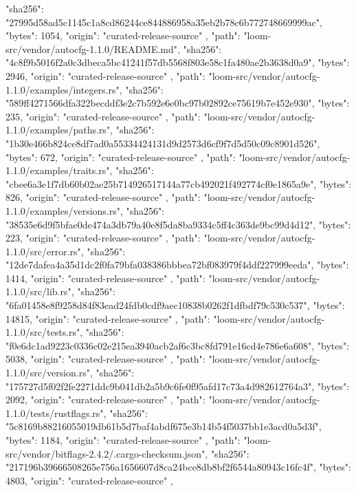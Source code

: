 {{      "sha256": "27995d58ad5c1145c1a8cd86244ce844886958a35eb2b78c6b772748669999ac",
      "bytes": 1054,
      "origin": "curated-release-source"
    },
    {
      "path": "loom-src/vendor/autocfg-1.1.0/README.md",
      "sha256": "4c8f9b5016f2a0c3dbeca5bc41241f57db5568f803e58c1fa480ae2b3638d0a9",
      "bytes": 2946,
      "origin": "curated-release-source"
    },
    {
      "path": "loom-src/vendor/autocfg-1.1.0/examples/integers.rs",
      "sha256": "589ff4271566dfa322becddf3e2c7b592e6e0bc97b02892ce75619b7e452e930",
      "bytes": 235,
      "origin": "curated-release-source"
    },
    {
      "path": "loom-src/vendor/autocfg-1.1.0/examples/paths.rs",
      "sha256": "1b30e466b824ce8df7ad0a55334424131d9d2573d6cf9f7d5d50c09c8901d526",
      "bytes": 672,
      "origin": "curated-release-source"
    },
    {
      "path": "loom-src/vendor/autocfg-1.1.0/examples/traits.rs",
      "sha256": "cbee6a3e1f7db60b02ae25b714926517144a77cb492021f492774cf0e1865a9e",
      "bytes": 826,
      "origin": "curated-release-source"
    },
    {
      "path": "loom-src/vendor/autocfg-1.1.0/examples/versions.rs",
      "sha256": "38535e6d9f5bfae0de474a3db79a40e8f5da8ba9334c5ff4c363de9bc99d4d12",
      "bytes": 223,
      "origin": "curated-release-source"
    },
    {
      "path": "loom-src/vendor/autocfg-1.1.0/src/error.rs",
      "sha256": "12de7dafea4a35d1dc2f0fa79bfa038386bbbea72bf083979f4ddf227999eeda",
      "bytes": 1414,
      "origin": "curated-release-source"
    },
    {
      "path": "loom-src/vendor/autocfg-1.1.0/src/lib.rs",
      "sha256": "6fa01458e8f9258d84f83ead24fdb0cdf9aec10838b0262f1dfbdf79c530c537",
      "bytes": 14815,
      "origin": "curated-release-source"
    },
    {
      "path": "loom-src/vendor/autocfg-1.1.0/src/tests.rs",
      "sha256": "f0e6dc1ad9223c0336c02e215ea3940acb2af6c3bc8fd791e16cd4e786e6a608",
      "bytes": 5038,
      "origin": "curated-release-source"
    },
    {
      "path": "loom-src/vendor/autocfg-1.1.0/src/version.rs",
      "sha256": "175727d5f02f2fe2271ddc9b041db2a5b9c6fe0f95afd17c73a4d982612764a3",
      "bytes": 2092,
      "origin": "curated-release-source"
    },
    {
      "path": "loom-src/vendor/autocfg-1.1.0/tests/rustflags.rs",
      "sha256": "5c8169b88216055019db61b5d7baf4abdf675e3b14b54f5037bb1e3acd0a5d3f",
      "bytes": 1184,
      "origin": "curated-release-source"
    },
    {
      "path": "loom-src/vendor/bitflags-2.4.2/.cargo-checksum.json",
      "sha256": "217196b39666508265e756a1656607d8ca24bce8db8bf2f6544a80943c16fc4f",
      "bytes": 4803,
      "origin": "curated-release-source"
    },
    {
}}
